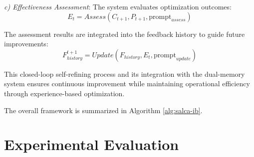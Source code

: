 \documentclass[conference]{IEEEtran}
\begin{document}
\textit{c) Effectiveness Assessment}: The system evaluates optimization outcomes:
\begin{equation}
    E_t = Assess(C_{t+1}, P_{t+1}, \text{prompt}_{assess})
\end{equation}

The assessment results are integrated into the feedback history to guide future improvements:
\begin{equation}
    F_{history}^{t+1} = Update(F_{history}, E_t, \text{prompt}_{update})
\end{equation}

This closed-loop self-refining process and its integration with the dual-memory system ensures continuous improvement while maintaining operational efficiency through experience-based optimization.

The overall framework is summarized in Algorithm \ref{alg:salca-ib}.



\section{Experimental Evaluation}
\end{document}

